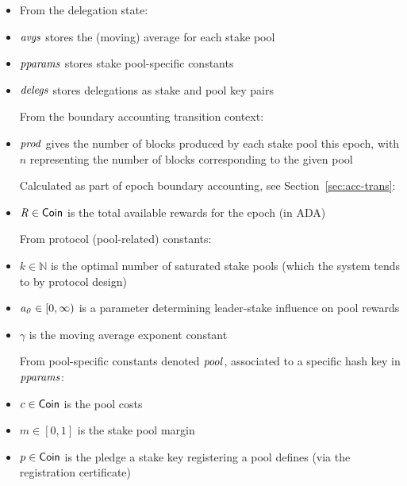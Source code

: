 \begin{itemize}
\item[] From the delegation state:
\item $\mathit{avgs}$ stores the (moving) average for each
stake pool
\item $\mathit{pparams}$ stores stake pool-specific constants
\item $\mathit{delegs}$ stores delegations as stake and pool key pairs \newline

From the boundary accounting transition context:
\item $\mathit{prod}$ gives the number of blocks produced by each stake pool
this epoch, with $n$ representing the number of blocks corresponding to the
given pool \newline

Calculated as part of epoch boundary accounting, see
Section~\ref{sec:acc-trans}:
\item $\mathit{R} \in \mathsf{Coin}$ is the total available rewards for the epoch (in ADA) \newline

From protocol (pool-related) constants:
\item $k \in \mathbb{N}$ is the optimal number of saturated stake pools (which the system
tends to by protocol design)
\item $\mathit{a_0} \in [0, \infty)$ is a parameter determining leader-stake
influence on pool rewards
\item $\gamma$ is the moving average exponent constant \newline

From pool-specific constants denoted $\mathit{pool}$, associated to a specific
hash key in $\mathit{pparams}$:
\item $c \in \mathsf{Coin}$ is the pool costs
\item $m \in [0,1]$ is the stake pool margin
\item $p \in \mathsf{Coin}$ is the pledge a stake key registering a pool defines (via
the registration certificate)\newline


\end{itemize}
